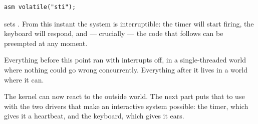 \begin{lstlisting}[style=c]
asm volatile("sti");
\end{lstlisting}

 sets . From this instant the system is interruptible: the timer will start firing,
the keyboard will respond, and --- crucially --- the code that follows can be preempted at any
moment.

Everything before this point ran with interrupts off, in a single-threaded world where nothing could
go wrong concurrently. Everything after it lives in a world where it can.

\begin{summary}
The kernel can now react to the outside world. The next part puts that to use with the two drivers
that make an interactive system possible: the timer, which gives it a heartbeat, and the keyboard,
which gives it ears.
\end{summary}
